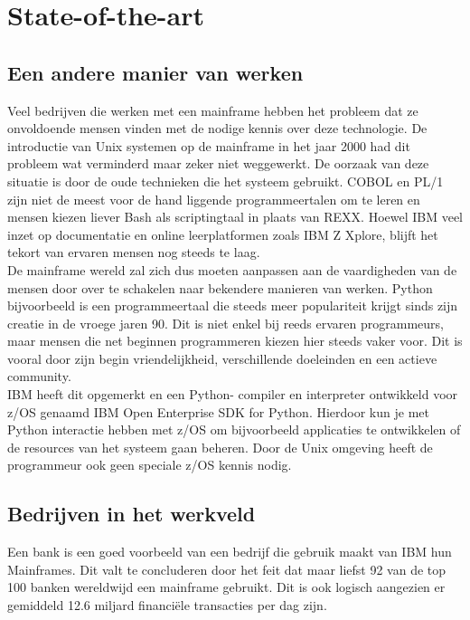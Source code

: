 
\section{State-of-the-art}%
\label{sec:state-of-the-art}

\subsection{Een andere manier van werken}
Veel bedrijven die werken met een mainframe hebben het probleem dat ze onvoldoende mensen vinden met de nodige kennis over deze technologie. De introductie van Unix systemen op de mainframe in het jaar 2000 \autocite{Mertic2020} had dit probleem wat verminderd maar zeker niet weggewerkt. De oorzaak van deze situatie is door de oude technieken die het systeem gebruikt. COBOL en PL/1 zijn niet de meest voor de hand liggende programmeertalen om te leren en mensen kiezen liever Bash als scriptingtaal in plaats van REXX. Hoewel IBM veel inzet op documentatie en online leerplatformen zoals IBM Z Xplore, blijft het tekort van ervaren mensen nog steeds te laag. \\

De mainframe wereld zal zich dus moeten aanpassen aan de vaardigheden van de mensen door over te schakelen naar bekendere manieren van werken. 
Python bijvoorbeeld is een programmeertaal die steeds meer populariteit krijgt sinds zijn creatie in de vroege jaren 90. Dit is niet enkel bij reeds ervaren programmeurs, maar mensen die net beginnen programmeren kiezen hier steeds vaker voor. Dit is vooral door zijn begin vriendelijkheid, verschillende doeleinden en een actieve community. \autocite{Johnson2023} \\

IBM heeft dit opgemerkt en een Python- compiler en interpreter ontwikkeld voor z/OS genaamd IBM Open Enterprise SDK for Python. Hierdoor kun je met Python interactie hebben met z/OS om bijvoorbeeld applicaties te ontwikkelen of de resources van het systeem gaan beheren. Door de Unix omgeving heeft de programmeur ook geen speciale z/OS kennis nodig. \autocite{Klaey2023} \\

\subsection{Bedrijven in het werkveld}
Een bank is een goed voorbeeld van een bedrijf die gebruik maakt van IBM hun Mainframes. Dit valt te concluderen door het feit dat maar liefst 92 van de top 100 banken wereldwijd een mainframe gebruikt. Dit is ook logisch aangezien er gemiddeld 12.6 miljard financiële transacties per dag zijn. \autocite{Wagle2017} \\

